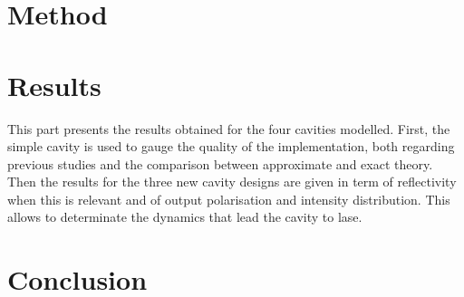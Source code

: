 \documentclass{report}
\begin{document}
\chapter{Method}

\chapter{Results}
This part presents the results obtained for the four cavities modelled. First, the simple cavity is used to gauge the quality of the implementation, both regarding previous studies and the comparison between approximate and exact theory. Then the results for the three new cavity designs are given in term of reflectivity when this is relevant and of output polarisation and intensity distribution. This allows to determinate the dynamics that lead the cavity to lase.




\chapter{Conclusion}

\printbibliography
\appendix




\end{document}
